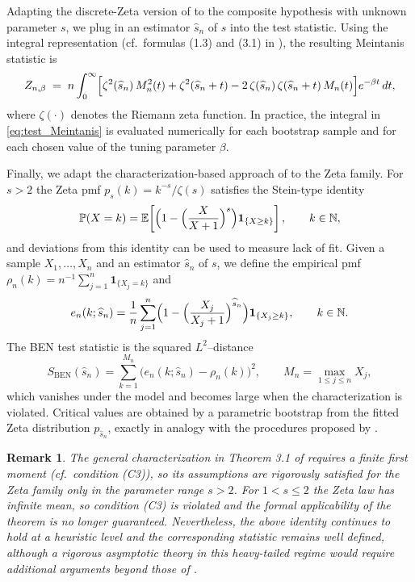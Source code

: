 \documentclass{article}
\theoremstyle{thm}
\theoremstyle{def}
\newtheorem{remark}[theorem]{Remark}
\newcommand{\E}{\mathbb{E}} %
\begin{document}
Adapting the discrete-Zeta version of \citet{M:2009} to the composite hypothesis
with unknown parameter $s$, we plug in an estimator $\widehat{s}_n$ of $s$ into the test
statistic. Using the integral representation (cf.\ formulas (1.3) and (3.1) in
\cite{M:2009}), the resulting Meintanis statistic is
\begin{equation}\label{eq:test_Meintanis}
  Z_{n,\beta}
  \;=\;
  n \int_0^\infty
    \Bigl[
       \zeta^2(\widehat{s}_n)\,M_n^2(t)
       + \zeta^2(\widehat{s}_n + t)
       - 2\,\zeta(\widehat{s}_n)\,\zeta(\widehat{s}_n + t)\,M_n(t)
    \Bigr]
    e^{-\beta t}\,dt,
\end{equation}
where $\zeta(\cdot)$ denotes the Riemann zeta function. In practice, the integral in
\eqref{eq:test_Meintanis} is evaluated numerically for each bootstrap sample and for each
chosen value of the tuning parameter $\beta$.

Finally, we adapt the characterization-based approach of \citet{BEN:2022}
to the Zeta family. For $s>2$ the Zeta pmf $p_s(k)=k^{-s}/\zeta(s)$ satisfies the
Stein-type identity
\[
  \mathbb{P}(X=k)
  =
  \E\!\left[
    \Bigl(1-\Bigl(\frac{X}{X+1}\Bigr)^{s}\Bigr)\mathbf{1}_{\{X\ge k\}}
  \right],\qquad k\in\mathbb{N},
\]
and deviations from this identity can be used to measure lack of fit. Given a sample
$X_1,\dots,X_n$ and an estimator $\widehat{s}_n$ of $s$, we define the empirical pmf
$\rho_n(k)=n^{-1}\sum_{j=1}^n \mathbf{1}_{\{X_j=k\}}$ and
\[
  e_n(k;\widehat{s}_n)
  =
  \frac{1}{n}\sum_{j=1}^n
    \Bigl(1-\Bigl(\frac{X_j}{X_j+1}\Bigr)^{\widehat{s}_n}\Bigr)
    \mathbf{1}_{\{X_j\ge k\}},
  \qquad k\in\mathbb{N}.
\]
The BEN test statistic is the squared $L^2$–distance
\[
  S_{\mathrm{BEN}}(\widehat{s}_n)
  =
  \sum_{k=1}^{M_n} \bigl(e_n(k;\widehat{s}_n)-\rho_n(k)\bigr)^2,
  \qquad M_n = \max_{1\le j\le n} X_j,
\]
which vanishes under the model and becomes large when the characterization is violated.
Critical values are obtained by a parametric bootstrap from the fitted Zeta distribution
$p_{\widehat{s}_n}$, exactly in analogy with the procedures proposed by \citet{BEN:2022}.

\begin{remark}
The general characterization in Theorem 3.1 of \citet{BEN:2022} requires a finite first moment
(cf.\ condition (C3)), so its assumptions are rigorously satisfied for the Zeta
family only in the parameter range $s>2$. For $1<s\le 2$ the Zeta law has infinite mean, so
condition (C3) is violated and the formal applicability of the theorem is no longer
guaranteed. Nevertheless, the above identity continues to hold at a heuristic level and
the corresponding statistic remains well defined, although a rigorous asymptotic theory in this
heavy-tailed regime would require additional arguments beyond those of
\citet{BEN:2022}.
\end{remark}
\end{document}
